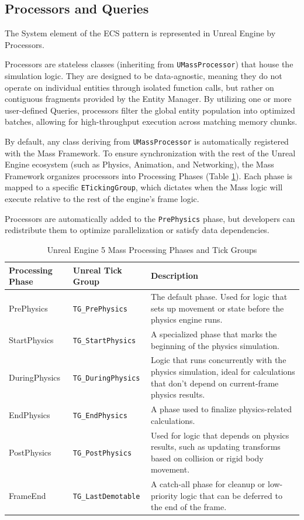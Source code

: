 \subsection{Processors and Queries}

The System element of the ECS pattern is represented in Unreal Engine by Processors. 

Processors are stateless classes (inheriting from \texttt{UMassProcessor}) that house the simulation logic. They are designed to be data-agnostic, meaning they do not operate on individual entities through isolated function calls, but rather on contiguous fragments provided by the Entity Manager. By utilizing one or more user-defined Queries, processors filter the global entity population into optimized batches, allowing for high-throughput execution across matching memory chunks.

By default, any class deriving from \texttt{UMassProcessor}  is automatically registered with the Mass Framework. To ensure synchronization with the rest of the Unreal Engine ecosystem (such as Physics, Animation, and Networking), the Mass Framework organizes processors into Processing Phases (Table \ref{tab:ue5_tick_groups}). Each phase is mapped to a specific \texttt{ETickingGroup}, which dictates when the Mass logic will execute relative to the rest of the engine's frame logic.

Processors are automatically added to the \texttt{PrePhysics} phase, but developers can redistribute them to optimize parallelization or satisfy data dependencies.\newline

\begin{table}[h]
    \centering
    \caption{Unreal Engine 5 Mass Processing Phases and Tick Groups}
    \label{tab:ue5_tick_groups}
    \begin{tabular}{|l|l|p{5.7cm}|}
        \hline
        \textbf{Processing Phase} & \textbf{Unreal Tick Group} & \textbf{Description} \\ \hline
        PrePhysics & \texttt{TG\_PrePhysics} & The default phase. Used for logic that sets up movement or state before the physics engine runs. \\ \hline
        StartPhysics & \texttt{TG\_StartPhysics} & A specialized phase that marks the beginning of the physics simulation. \\ \hline
        DuringPhysics & \texttt{TG\_DuringPhysics} & Logic that runs concurrently with the physics simulation, ideal for calculations that don't depend on current-frame physics results. \\ \hline
        EndPhysics & \texttt{TG\_EndPhysics} & A phase used to finalize physics-related calculations. \\ \hline
        PostPhysics & \texttt{TG\_PostPhysics} & Used for logic that depends on physics results, such as updating transforms based on collision or rigid body movement. \\ \hline
        FrameEnd & \texttt{TG\_LastDemotable} & A catch-all phase for cleanup or low-priority logic that can be deferred to the end of the frame. \\ \hline
    \end{tabular}
\end{table}

